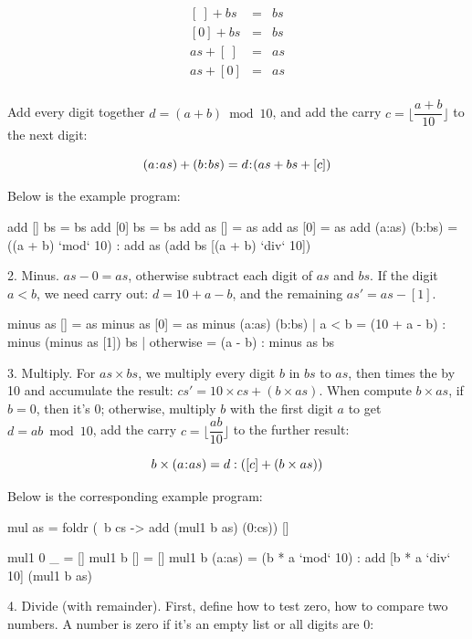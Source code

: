 \documentclass[b5paper]{article}
\begin{document}
\begin{Answer}[ref = {ex:list-others}]
{\[
\begin{array}{rcl}
\left[ \ \right] + bs & = & bs \\
\left[ 0 \right] + bs & = & bs \\
as + \left[\ \right] & = & as \\
as + \left[ 0 \right] & = & as \\
\end{array}
\]

Add every digit together $d = (a + b) \bmod 10$, and add the carry $c = \lfloor \dfrac{a + b}{10} \rfloor$ to the next digit:

\[
(a \mathbin{\!:\!} as) + (b \mathbin{\!:\!} bs) = d \mathbin{\!:\!} (as + bs + [c])
\]

Below is the example program:
\begin{Haskell}
add [] bs = bs
add [0] bs = bs
add as [] = as
add as [0] = as
add (a:as) (b:bs) = ((a + b) `mod` 10) : add as (add bs [(a + b) `div` 10])
\end{Haskell}

2. Minus. $as - 0 = as$, otherwise subtract each digit of $as$ and $bs$. If the digit $a < b$, we need carry out: $d = 10 + a - b$, and the remaining $as' = as - [1]$.

\begin{Haskell}
minus as [] = as
minus as [0] = as
minus (a:as) (b:bs) | a < b = (10 + a - b) : minus (minus as [1]) bs
                    | otherwise = (a - b) : minus as bs
\end{Haskell}

3. Multiply. For $as \times bs$, we multiply every digit $b$ in $bs$ to $as$, then times the by 10 and accumulate the result: $cs' = 10 \times cs + (b \times as)$. When compute $b \times as$, if $b = 0$, then it's $0$; otherwise, multiply $b$ with the first digit $a$ to get $d = ab \bmod 10$, add the carry $c = \lfloor \dfrac{ab}{10} \rfloor$ to the further result:

\[
b \times (a \mathbin{\!:\!} as) = d : ([c] + (b \times as))
\]

Below is the corresponding example program:

\begin{Haskell}
mul as = foldr (\ b cs -> add (mul1 b as) (0:cs)) []

mul1 0 _ = []
mul1 b [] = []
mul1 b (a:as) = (b * a `mod` 10) : add [b * a `div` 10] (mul1 b as)
\end{Haskell}

4. Divide (with remainder). First, define how to test zero, how to compare two numbers. A number is zero if it's an empty list or all digits are 0:

}
\end{Answer}
\end{document}

